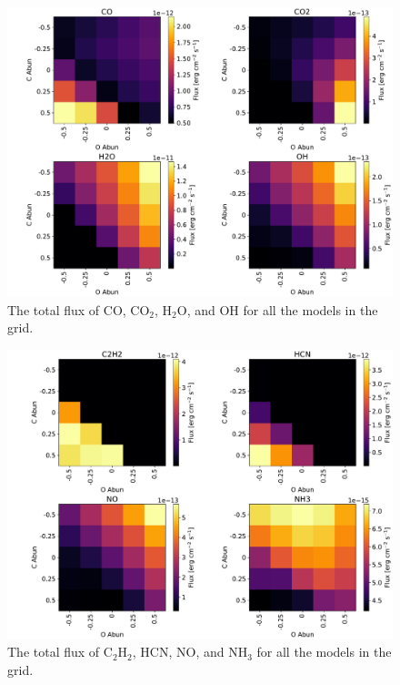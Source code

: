 \documentclass[twoside, single, authoryear, semicolon]{lion-msc}
\newcommand{\4}{$_4$}
\newcommand{\3}{$_3$}
\newcommand{\2}{$_2$}
\begin{document}
\begin{figure}[!ht]
    \centering
    \includegraphics[width=\linewidth]{Figures/Heatmaps1.pdf}
    \caption{The total flux of CO, CO\2, H\2O, and OH for all the models in the grid.}
    \label{fig: Heatmaps1}
\end{figure}
\begin{figure}[!ht]
    \centering
    \includegraphics[width=\linewidth]{Figures/Heatmaps2.pdf}
    \caption{The total flux of C\2H\2, HCN, NO, and NH\3 for all the models in the grid.}
    \label{fig: Heatmaps2}
\end{figure}
\end{document}
